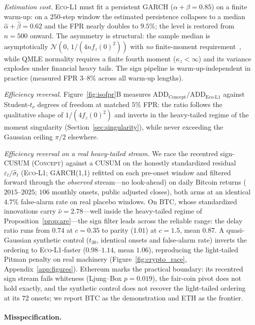 \documentclass[sigconf,anonymous,review]{acmart}
\theoremstyle{acmdefinition}
\begin{document}
\emph{Estimation cost.} \textsc{Eco-L1} must fit a persistent GARCH ($\alpha+\beta = 0.85$) on a finite warm-up: on a $250$-step window the estimated persistence collapses to a median $\hat\alpha+\hat\beta = 0.62$ and the FPR nearly doubles to $9.5\%$; the level is restored from $n = 500$ onward. The asymmetry is structural: the sample median is asymptotically $\mathcal{N}(0,\, 1/(4nf_z(0)^2))$ with \emph{no} finite-moment requirement~\cite{vandervaart_1998}, while QMLE normality requires a finite fourth moment ($\kappa_z < \infty$) and its variance explodes under financial heavy tails. The sign pipeline is warm-up-independent in practice (measured FPR $3$--$8\%$ across all warm-up lengths).

\emph{Efficiency reversal.} Figure~\ref{fig:isofpr}B measures $\mathrm{ADD}_{\mathrm{Concept}}/\mathrm{ADD}_{\mathrm{Eco\text{-}L1}}$ against Student-$t_\nu$ degrees of freedom at matched $5\%$ FPR: the ratio follows the qualitative shape of $1/(4f_z(0)^2)$ and inverts in the heavy-tailed regime of the moment singularity (Section~\ref{sec:singularity}), while never exceeding the Gaussian ceiling $\pi/2$ elsewhere.

\emph{Efficiency reversal on a real heavy-tailed stream.} We race the recentred sign-CUSUM (\textsc{Concept}) against a CUSUM on the honestly standardized residual $\varepsilon_t/\hat{\sigma}_t$ (\textsc{Eco-L1}; GARCH(1,1) refitted on each pre-onset window and filtered forward through the \emph{observed} stream---no look-ahead) on daily Bitcoin returns ($2015$--$2025$; $106$ monthly onsets, public adjusted closes), both arms at an identical $4.7\%$ false-alarm rate on real placebo windows. On BTC, whose standardized innovations carry $\hat{\nu} = 2.78$---well inside the heavy-tailed regime of Proposition~\ref{prop:are}---the sign filter leads across the reliable range: the delay ratio runs from $0.74$ at $c = 0.35$ to parity ($1.01$) at $c = 1.5$, mean $0.87$. A quasi-Gaussian synthetic control ($t_{30}$, identical onsets and false-alarm rate) inverts the ordering to \textsc{Eco-L1}-faster ($0.98$--$1.14$, mean $1.06$), reproducing the light-tailed Pitman penalty on real machinery (Figure~\ref{fig:crypto_race}, Appendix~\ref{app:figures}). Ethereum marks the practical boundary: its recentred sign stream fails whiteness (Ljung--Box $p = 0.019$), the fair-coin pivot does not hold exactly, and the synthetic control does not recover the light-tailed ordering at its $72$ onsets; we report BTC as the demonstration and ETH as the frontier.

\paragraph{Misspecification.}
\end{document}

